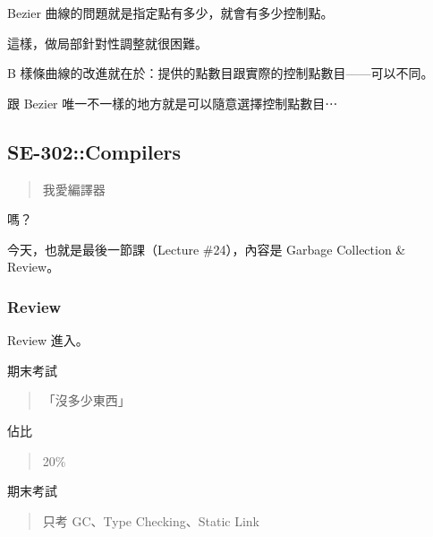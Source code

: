 \documentclass[
]{article}
\begin{document}
Bezier 曲線的問題就是指定點有多少，就會有多少控制點。

這樣，做局部針對性調整就很困難。

B 樣條曲線的改進就在於：提供的點數目跟實際的控制點數目------可以不同。

跟 Bezier 唯一不一樣的地方就是可以隨意選擇控制點數目⋯

\hypertarget{header-n56}{%
\subsection{SE-302::Compilers}\label{header-n56}}

\begin{quote}
我愛編譯器
\end{quote}

嗎？

今天，也就是最後一節課（Lecture \#24），內容是 Garbage Collection \&
Review。

\hypertarget{header-n61}{%
\subsubsection{Review}\label{header-n61}}

Review 進入。

期末考試

\begin{quote}
「沒多少東西」
\end{quote}

佔比

\begin{quote}
20\%
\end{quote}

期末考試

\begin{quote}
只考 GC、Type Checking、Static Link
\end{quote}
\end{document}
